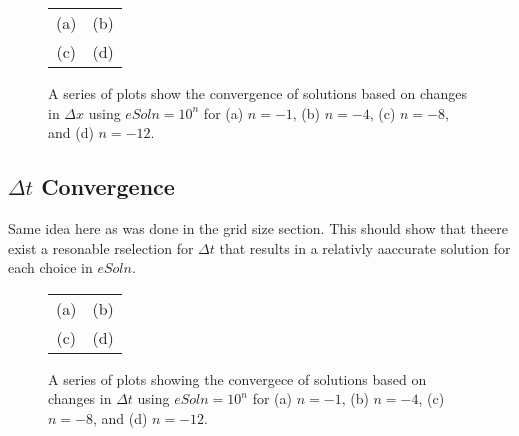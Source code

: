   \begin{figure}
    \centering
    \begin{tabular}{c c}
    (a) & (b) \\
    (c) & (d) 
    \end{tabular}
    \caption{A series of plots show the convergence of solutions based on changes in $\Delta x$ using $eSoln = 10^n$ for (a) $n = -1$, (b) $n = -4$, (c) $n = -8$, and (d) $n = -12$.} 
    \label{fig:converge_spatial}
  \end{figure}

\subsection{$\Delta t$ Convergence}
  Same idea here as was done in the grid size section. This should show that theere exist a resonable rselection for $\Delta t$ that results in a relativly aaccurate solution for each choice in $eSoln$.

  \begin{figure}
    \centering
    \begin{tabular}{c c}
    (a) & (b) \\
    (c) & (d)
    \end{tabular}
    \caption{A series of plots showing the convergece of solutions based on changes in $\Delta t$ using $eSoln = 10^n$ for (a) $n = -1$, (b) $n = -4$, (c) $n = -8$, and (d) $n = -12$.} 

  \end{figure}
   
